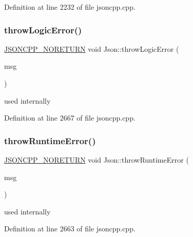 Definition at line 2232 of file jsoncpp.\+cpp.

\hypertarget{namespace_json_a27790f21f17922fac81e7cd72a5659a5}{}\label{namespace_json_a27790f21f17922fac81e7cd72a5659a5} 
\subsubsection{\texorpdfstring{throw\+Logic\+Error()}{throwLogicError()}}
{\footnotesize\ttfamily \hyperlink{value_8h_a78c5ba441d8b48f24a5095b97f01f282}{J\+S\+O\+N\+C\+P\+P\+\_\+\+N\+O\+R\+E\+T\+U\+RN} void Json\+::throw\+Logic\+Error (\begin{DoxyParamCaption}\item[{\hyperlink{config_8h_a1e723f95759de062585bc4a8fd3fa4be}{J\+S\+O\+N\+C\+P\+P\+\_\+\+S\+T\+R\+I\+NG} const \&}]{msg }\end{DoxyParamCaption})}



used internally 



Definition at line 2667 of file jsoncpp.\+cpp.

\hypertarget{namespace_json_a0ab7ff7f99788262d92d9ff3d924e065}{}\label{namespace_json_a0ab7ff7f99788262d92d9ff3d924e065} 
\subsubsection{\texorpdfstring{throw\+Runtime\+Error()}{throwRuntimeError()}}
{\footnotesize\ttfamily \hyperlink{value_8h_a78c5ba441d8b48f24a5095b97f01f282}{J\+S\+O\+N\+C\+P\+P\+\_\+\+N\+O\+R\+E\+T\+U\+RN} void Json\+::throw\+Runtime\+Error (\begin{DoxyParamCaption}\item[{\hyperlink{config_8h_a1e723f95759de062585bc4a8fd3fa4be}{J\+S\+O\+N\+C\+P\+P\+\_\+\+S\+T\+R\+I\+NG} const \&}]{msg }\end{DoxyParamCaption})}



used internally 



Definition at line 2663 of file jsoncpp.\+cpp.

\hypertarget{namespace_json_a19a9262b788aa2754d3931e7cd01f2fc}{}\label{namespace_json_a19a9262b788aa2754d3931e7cd01f2fc} 
